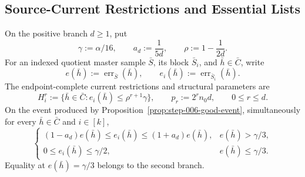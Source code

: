 \subsection{Source-Current Restrictions and Essential Lists}\label{app:step_008}

On the positive branch \(d\ge1\), put
\[
 \gamma:=\alpha/16,\qquad
 a_d:=\frac{1}{5d},\qquad
 \rho:=1-\frac{1}{2d}.
\tag{1}
\]
For an indexed quotient master sample \(\bar S\), its block
\(\bar S_i\), and \(\bar h\in\bar C\), write
\[
 e(\bar h):=\operatorname{err}_{\bar S}(\bar h),
 \qquad
 e_i(\bar h):=\operatorname{err}_{\bar S_i}(\bar h).
\tag{2}
\]
The endpoint-complete current restrictions and structural parameters are
\[
 H_i^r:=\{\bar h\in\bar C:e_i(\bar h)\leq
                  \rho^{r+1}\gamma\},
 \qquad
 p_r:=2^r n_0d,
 \qquad 0\leq r\leq d.
\tag{3}
\]
On the event produced by Proposition~\ref{prop:step-006-good-event},
simultaneously for every \(\bar h\in\bar C\) and \(i\in[k]\),
\[
\begin{cases}
 (1-a_d)e(\bar h)\leq e_i(\bar h)
       \leq(1+a_d)e(\bar h),
       &e(\bar h)>\gamma/3,\\
 0\leq e_i(\bar h)\leq\gamma/2,
       &e(\bar h)\leq\gamma/3.
\end{cases}
\tag{4}
\]
Equality at \(e(\bar h)=\gamma/3\) belongs to the second branch.

